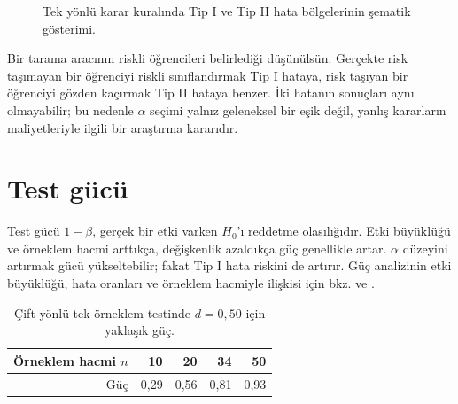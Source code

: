 \begin{figure}[H]
\centering
{}
\caption{Tek yönlü karar kuralında Tip I ve Tip II hata bölgelerinin şematik gösterimi.}
\label{fig:error-regions}
\end{figure}

Bir tarama aracının riskli öğrencileri belirlediği düşünülsün. Gerçekte risk
taşımayan bir öğrenciyi riskli sınıflandırmak Tip I hataya, risk taşıyan bir
öğrenciyi gözden kaçırmak Tip II hataya benzer. İki hatanın sonuçları aynı
olmayabilir; bu nedenle $\alpha$ seçimi yalnız geleneksel bir eşik değil,
yanlış kararların maliyetleriyle ilgili bir araştırma kararıdır.

\section{Test gücü}
\label{sec:power}

Test gücü $1-\beta$, gerçek bir etki varken $H_0$'ı reddetme olasılığıdır.
Etki büyüklüğü ve örneklem hacmi arttıkça, değişkenlik azaldıkça güç genellikle
artar. $\alpha$ düzeyini artırmak gücü yükseltebilir; fakat Tip I hata riskini
de artırır. Güç analizinin etki büyüklüğü, hata oranları ve örneklem hacmiyle
ilişkisi için bkz. \citet{cohen1988} ve \citet{lakens2022}.

\begin{table}[H]
\centering
\caption{Çift yönlü tek örneklem \tstat testinde $d=0{,}50$ için yaklaşık güç.}
\label{tab:power-by-n}
\begin{tabular}{rrrrr}
\toprule
Örneklem hacmi $n$ & 10 & 20 & 34 & 50 \\
\midrule
Güç & 0,29 & 0,56 & 0,81 & 0,93 \\
\bottomrule
\end{tabular}
\end{table}

